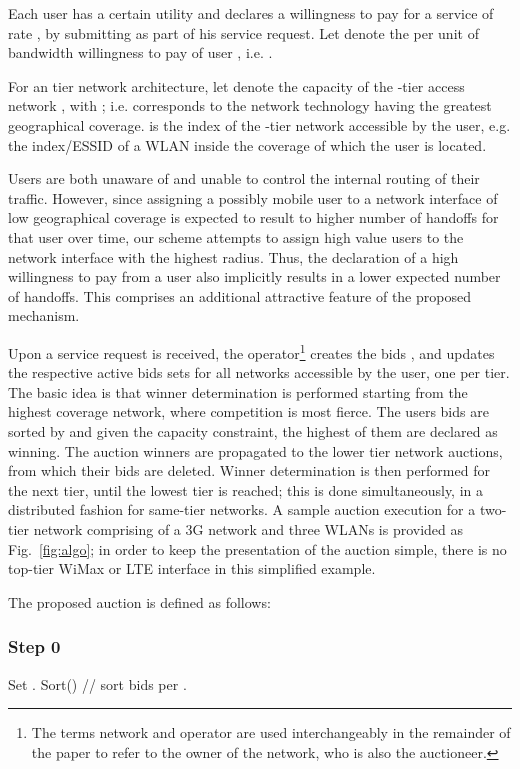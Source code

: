 \documentclass[a4paper]{article}
\begin{document}
Each user  has a certain utility  
and declares a willingness to pay  for a service of rate , by 
submitting  as part of his service request. Let  denote the per unit 
of bandwidth willingness to pay of user , i.e. .

For an tier network architecture, let  denote the capacity of 
the -tier access network , with ; i.e. 
corresponds to the network technology having the greatest geographical coverage. 
 is the index of the -tier network accessible by the user, e.g. the 
index/ESSID of a WLAN inside the coverage of which the user is located. 

Users are both unaware of and unable to control the internal routing of 
their traffic. However, since assigning a possibly mobile user to a network 
interface of low geographical coverage is expected to result to higher number 
of handoffs for that user over time, our scheme
attempts to assign high value users to the network interface with the highest radius.
Thus, the declaration of a high willingness to pay from a user also implicitly results 
in a lower expected number of handoffs. This comprises an additional attractive feature of 
the proposed mechanism.

Upon a service request is received, the operator\footnote{The terms network and operator
are used interchangeably in the remainder of the paper to refer to the owner of the network, who is also the auctioneer.} creates the bids 
 ,  and updates the 
respective active bids sets  for all networks 
accessible by the user, one per tier. 
The basic idea is that winner determination is performed starting from
the highest coverage network, where competition is most fierce. The 
users bids are sorted by  and given the capacity constraint, the 
highest of them are declared as winning. The auction winners are propagated to the
lower tier network auctions, from which their bids are deleted. Winner determination is 
then performed for the next tier, until the lowest tier is reached; this is done
simultaneously, in a distributed fashion for same-tier networks.
A sample auction execution for a two-tier network comprising of a 3G network
and three WLANs is provided as Fig.~\ref{fig:algo}; in order to keep the
presentation of the auction simple,
there is no
top-tier WiMax or LTE interface in this simplified example.

The proposed auction is defined as follows:
\subsubsection*{Step 0} Set . Sort()  // sort bids per .
\end{document}
